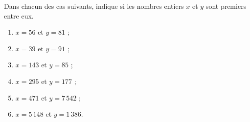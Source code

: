 
Dans chacun des cas suivants, indique si les nombres entiers $x$ et $y$ sont premiers entre eux.
\begin{multicols}{3}
\begin{enumerate}
\item $x=56$ et $y=81$ ;
\item $x=39$ et $y=91$ ;
\item $x=143$ et $y=85$ ;
\item $x=295$ et $y=177$ ;
\item $x=471$ et $y=7\,542$ ;
\item $x=5\,148$ et $y=1\,386$.
\end{enumerate}
\end{multicols}
